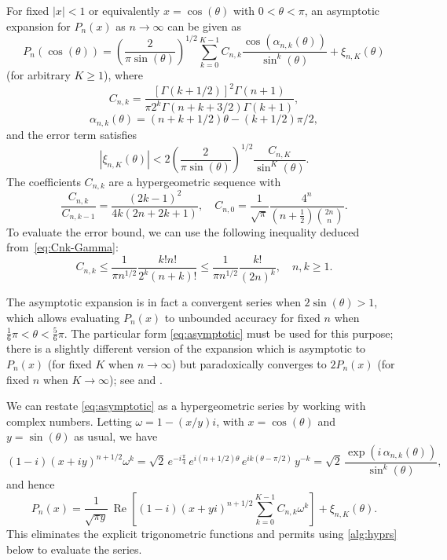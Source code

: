 \documentclass[nohypdvips,review]{siamart0216}
\begin{document}
For fixed $|x| < 1$ or equivalently $x = \cos(\theta)$ with $0 < \theta < \pi$,
an asymptotic expansion for $P_n(x)$ as $n \to \infty$
can be given as \cite[Eq.~3.4]{Bogaert2012}
\begin{equation}
\label{eq:asymptotic}
P_n(\cos(\theta)) = \left(\frac{2}{\pi \sin(\theta)}\right)^{1/2}
\sum_{k=0}^{K-1} C_{n,k} \frac{\cos(\alpha_{n,k}(\theta))}{\sin^k(\theta)}
+ \xi_{n,K}(\theta)
\end{equation}
(for arbitrary $K \geq 1$), where
\begin{equation}
\label{eq:Cnk-Gamma}
C_{n,k} = \frac{[\Gamma(k+1/2)]^2 \Gamma(n+1)}{\pi 2^k \Gamma(n+k+3/2) \Gamma(k+1)},
\end{equation}
\begin{equation*}
\alpha_{n,k}(\theta) = (n+k+1/2) \theta - (k+1/2) \pi / 2,
\end{equation*}
and the error term satisfies
\begin{equation}
\label{eq:truncerr0}
|\xi_{n,K}(\theta)| < 2 \left(\frac{2}{\pi \sin(\theta)}\right)^{1/2} \frac{C_{n,K}}{\sin^K(\theta)}.
\end{equation}
The coefficients $C_{n,k}$ are a hypergeometric sequence with
\begin{equation}
\label{eq:asymprec}
\frac{C_{n,k}}{C_{n,k-1}} = \frac{(2k-1)^2}{4 k (2n+2k+1)}, \quad C_{n,0} = \frac{1}{\sqrt{\pi}} \frac{4^n}{(n+\tfrac{1}{2}) {2n \choose n}}.
\end{equation}
To evaluate the error bound, we can use the following inequality deduced
from~\eqref{eq:Cnk-Gamma}:
\begin{equation}
\label{eq:truncerr0b}
C_{n,k} \le \frac{1}{\pi n^{1/2}} \frac{k! n!}{2^k (n+k)!} \le \frac{1}{\pi n^{1/2}} \frac{k!}{(2n)^k},
\quad n, k \ge 1.
\end{equation}

The asymptotic expansion is in fact a convergent series
when $2 \sin(\theta) > 1$, which allows evaluating $P_n(x)$ to unbounded
accuracy for fixed $n$ when $\tfrac{1}{6}\pi < \theta < \tfrac{5}{6} \pi$.
The particular form \cref{eq:asymptotic}
must be used for this purpose; there is a slightly different version of the expansion
which is asymptotic to $P_n(x)$ (for fixed $K$ when $n \to \infty$)
but paradoxically
converges to $2 P_n(x)$ (for fixed $n$ when $K \to \infty$); see \cite[Section~10.3]{Olver1997} and \cite[Section~18.15(iii)]{Olver2010}.

We can restate \cref{eq:asymptotic} as a hypergeometric series
by working with complex numbers.
Letting $\omega = 1 - (x/y) i$, with $x = \cos(\theta)$ and $y =
\sin(\theta)$ as usual, we have
\[ (1-i) (x+iy)^{n+1/2} \omega^k
= \sqrt2 \, e^{-i \frac{\pi}{4}} \, e^{i (n+1/2)\theta} \,
  e^{i k (\theta-\pi/2)} \, y^{-k}
= \sqrt2 \, \frac{\exp(i \, \alpha_{n,k}(\theta))}{\sin^k(\theta)}, \]
and hence
\begin{equation}
\label{eq:asymptoticcomplex}
P_n(x) = \frac{1}{\sqrt{\pi y}} \, \operatorname{Re}\left[
(1-i) (x+y i)^{n+1/2}
\sum_{k=0}^{K-1} C_{n,k} \omega^k\right] + \xi_{n,K}(\theta).
\end{equation}
This eliminates the explicit trigonometric functions and permits using
\cref{alg:hyprs} below to evaluate the series.
\end{document}

